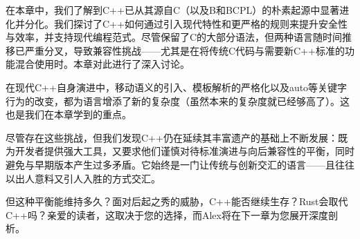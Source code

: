在本章中，我们了解到C++已从其源自C（以及B和BCPL）的朴素起源中显著进化并分化。我们探讨了C++如何通过引入现代特性和更严格的规则来提升安全性与效率，并支持现代编程范式。尽管保留了C的大部分语法，但两种语言随时间推移已严重分叉，导致兼容性挑战——尤其是在将传统C代码与需要新C++标准的功能混合使用时。本章对此进行了深入讨论。

在现代C++自身演进中，移动语义的引入、模板解析的严格化以及auto等关键字行为的改变，都为语言增添了新的复杂度（虽然本来的复杂度就已经够高了）。这也是我们在本章学到的重点。

尽管存在这些挑战，但我们发现C++仍在延续其丰富遗产的基础上不断发展：既为开发者提供强大工具，又要求他们谨慎对待标准演进与向后兼容性的平衡，同时避免与早期版本产生过多矛盾。它始终是一门让传统与创新交汇的语言——且往往以出人意料又引人入胜的方式交汇。

但这种平衡能维持多久？面对后起之秀的威胁，C++能否继续生存？Rust会取代C++吗？亲爱的读者，这取决于您的选择，而Alex将在下一章为您展开深度剖析。